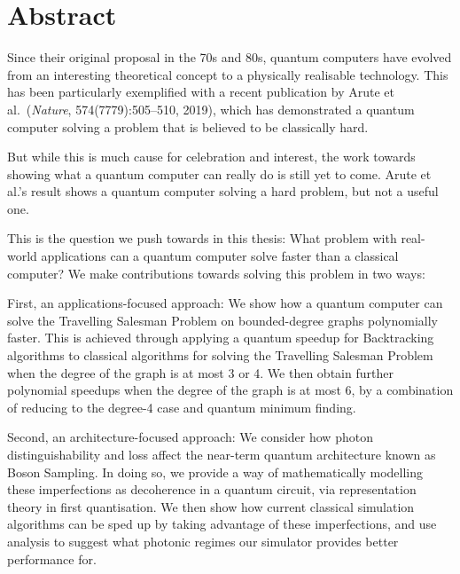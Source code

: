 \chapter*{Abstract}

Since their original proposal in the 70s and 80s, quantum computers have evolved from an interesting theoretical concept to a physically realisable technology. This has been particularly exemplified with a recent publication by Arute et al.~(\emph{Nature}, 574(7779):505--510, 2019), which has demonstrated a quantum computer solving a problem that is believed to be classically hard.

But while this is much cause for celebration and interest, the work towards showing what a quantum computer can really do is still yet to come. Arute et al.'s result shows a quantum computer solving a hard problem, but not a useful one.

This is the question we push towards in this thesis: What problem with real-world applications can a quantum computer solve faster than a classical computer? We make contributions towards solving this problem in two ways:

First, an applications-focused approach: We show how a quantum computer can solve the Travelling Salesman Problem on bounded-degree graphs polynomially faster. This is achieved through applying a quantum speedup for Backtracking algorithms to classical algorithms for solving the Travelling Salesman Problem when the degree of the graph is at most 3 or 4. We then obtain further polynomial speedups when the degree of the graph is at most 6, by a combination of reducing to the degree-4 case and quantum minimum finding.

Second, an architecture-focused approach: We consider how photon distinguishability and loss affect the near-term quantum architecture known as Boson Sampling. In doing so, we provide a way of mathematically modelling these imperfections as decoherence in a quantum circuit, via representation theory in first quantisation. We then show how current classical simulation algorithms can be sped up by taking advantage of these imperfections, and use analysis to suggest what photonic regimes our simulator provides better performance for.
